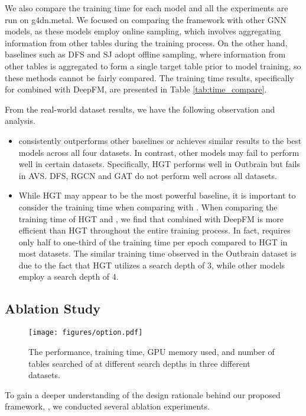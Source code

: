 We also compare the training time for each model and all the experiments are run on g4dn.metal. We focused on comparing the \model{} framework with other GNN models, as these models employ online sampling, which involves aggregating information from other tables during the training process. On the other hand, baselines such as DFS and SJ adopt offline sampling, where information from other tables is aggregated to form a single target table prior to model training, so these methods cannot be fairly compared. The training time results, specifically for \model{} combined with DeepFM, are presented in Table \ref{tab:time_compare}.

From the real-world dataset results, we have the following observation and analysis.
\begin{itemize}[leftmargin=*]
    \item \model{} consistently outperforms other baselines or achieves similar results to the best models across all four datasets. In contrast, other models may fail to perform well in certain datasets. Specifically, HGT performs well in Outbrain but fails in AVS. DFS, RGCN and GAT do not perform well across all datasets.
    \item While HGT may appear to be the most powerful baseline, it is important to consider the training time when comparing with \model{}. When comparing the training time of HGT and \model{}, we find that \model{} combined with DeepFM is more efficient than HGT throughout the entire training process. In fact, \model{} requires only half to one-third of the training time per epoch compared to HGT in most datasets. The similar training time observed in the Outbrain dataset is due to the fact that HGT utilizes a search depth of 3, while other models employ a search depth of 4.
\end{itemize}

\subsection{Ablation Study}

\begin{figure*}
    \centering
    \texttt{[image: figures/option.pdf]}
    \caption{The performance, training time, GPU memory used, and number of tables searched of \model{} at different search depths in three different datasets.}
    \label{fig:search depth}
\end{figure*}

To gain a deeper understanding of the design rationale behind our proposed framework, \model{}, we conducted several ablation experiments.
